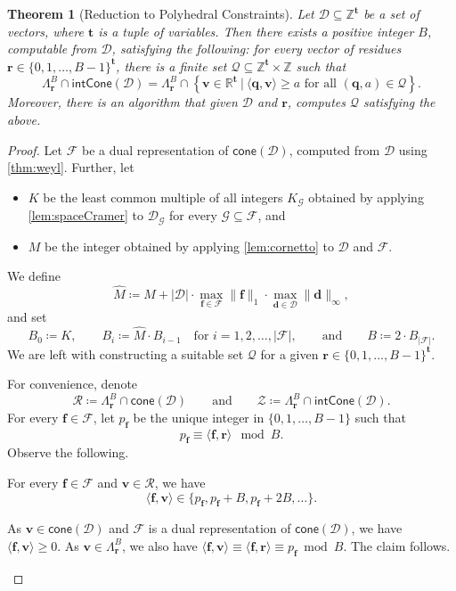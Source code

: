\documentclass{article}
\newtheorem{theorem}{Theorem}\newtheorem{lemma}[theorem]{Lemma}\newtheorem{proposition}[theorem]{Proposition}\newtheorem{corollary}[theorem]{Corollary}\newtheorem{definition}[theorem]{Definition}\newtheorem{claim}[theorem]{Claim}\newtheorem{remark}[theorem]{Remark}\newtheorem{observation}[theorem]{Observation}\newtheorem{conjecture}[theorem]{Conjecture}\newtheorem{example}[theorem]{Example}
\renewcommand{\geq}{\geqslant}
\newcommand{\Dd}{\mathcal{D}}
\newcommand{\Z}{\mathbb{Z}}
\newcommand{\R}{\mathbb{R}}
\newcommand{\tup}[1]{{\mathbf{#1}}}
\newcommand{\tv}{\tup t}
\newcommand{\ff}{\tup f}
\newcommand{\rr}{\tup r}
\newcommand{\dd}{\tup d}
\newcommand{\qq}{\tup q}
\newcommand{\myvv}{\tup v} %
\newcommand{\Qq}{\mathcal{Q}}
\newcommand{\Ff}{\mathcal{F}}
\newcommand{\Gg}{\mathcal{G}}
\newcommand{\Rr}{\mathcal{R}}
\newcommand{\Zz}{\mathcal{Z}}
\newcommand{\sca}[2]{\langle #1,#2\rangle}
\newcommand{\realcone}{\mathsf{cone}}
\newcommand{\intcone}{\mathsf{intCone}}
\begin{document}
\begin{theorem}[Reduction to Polyhedral Constraints]\label{thm:polyhedron}
 Let $\Dd\subseteq \Z^\tv$ be a set of vectors, where $\tv$ is a tuple of variables. Then there exists a positive integer $B$, computable from $\Dd$, satisfying the following: for every vector of residues $\rr\in \{0,1,\ldots,B-1\}^\tv$, there is a finite set $\Qq\subseteq \Z^\tv\times \Z$ such that
 $$\Lambda^B_\rr\cap \intcone(\Dd) = \Lambda^B_\rr\cap \left\{\myvv\in \R^\tv~|~\sca{\qq}{\myvv}\geq a\textrm{ for all }(\qq,a)\in \Qq\right\}.$$
 Moreover, there is an algorithm that given $\Dd$ and $\rr$, computes $\Qq$ satisfying the above.
\end{theorem}
\begin{proof}
 Let $\Ff$ be a dual representation of $\realcone(\Dd)$, computed from $\Dd$ using \cref{thm:weyl}. Further, let
 \begin{itemize}[nosep]
  \item $K$ be the least common multiple of all integers $K_\Gg$ obtained by applying \cref{lem:spaceCramer} to $\Dd_\Gg$ for every $\Gg\subseteq \Ff$, and
  \item $M$ be the integer obtained by applying \cref{lem:cornetto} to $\Dd$ and $\Ff$.
 \end{itemize}
 We define
 $$\widehat{M}\coloneqq M+|\Dd|\cdot \max_{\ff\in \Ff} \|\ff\|_1\cdot \max_{\dd\in \Dd} \|\dd\|_\infty,$$
and set
 $$B_0\coloneqq K,\qquad B_i\coloneqq \widehat{M}\cdot B_{i-1}\quad\textrm{for }i=1,2,\ldots,|\Ff|,\qquad \textrm{and}\qquad B\coloneqq 2\cdot B_{|\Ff|}.$$
We are left with constructing a suitable set $\Qq$ for a given $\rr\in \{0,1,\ldots,B-1\}^{\tv}$.

For convenience, denote
$$\Rr\coloneqq \Lambda_\rr^B\cap \realcone(\Dd)\qquad\textrm{and}\qquad \Zz\coloneqq \Lambda_\rr^B\cap \intcone(\Dd).$$
For every $\ff\in \Ff$, let $p_\ff$ be the unique integer in $\{0,1,\ldots,B-1\}$ such that
$$p_\ff\equiv \sca{\ff}{\rr}\mod B.$$
Observe the following.

\begin{techclaim}\label{cl:discreteSteps}
 For every $\ff\in \Ff$ and $\myvv\in \Rr$, we have
 $$\sca{\ff}{\myvv}\in \{p_\ff,p_\ff+B,p_\ff+2B,\ldots\}.$$
\end{techclaim}
\begin{subproof}
 As $\myvv\in \realcone(\Dd)$ and $\Ff$ is a dual representation of $\realcone(\Dd)$, we have $\sca{\ff}{\myvv}\geq 0$. As $\myvv\in \Lambda_\rr^B$, we also have $\sca{\ff}{\myvv}\equiv \sca{\ff}{\rr}\equiv p_\ff \bmod B$. The claim follows.
\end{subproof}


\end{proof}
\end{document}
